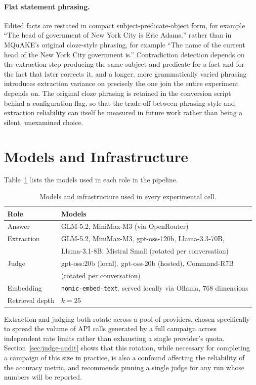 \paragraph{Flat statement phrasing.} Edited facts are restated in compact subject-predicate-object form, for example ``The head of government of New York City is Eric Adams,'' rather than in MQuAKE's original cloze-style phrasing, for example ``The name of the current head of the New York City government is.'' Contradiction detection depends on the extraction step producing the same subject and predicate for a fact and for the fact that later corrects it, and a longer, more grammatically varied phrasing introduces extraction variance on precisely the one join the entire experiment depends on. The original cloze phrasing is retained in the conversion script behind a configuration flag, so that the trade-off between phrasing style and extraction reliability can itself be measured in future work rather than being a silent, unexamined choice.

\section{Models and Infrastructure}
\label{sec:models-infra}

Table~\ref{tab:models} lists the models used in each role in the pipeline.

\begin{table}[H]
\centering
\caption{Models and infrastructure used in every experimental cell.}
\label{tab:models}
\begin{tabular}{ll}
\toprule
Role & Models \\
\midrule
Answer & GLM-5.2, MiniMax-M3 (via OpenRouter) \\
Extraction & GLM-5.2, MiniMax-M3, gpt-oss-120b, Llama-3.3-70B, \\
 & Llama-3.1-8B, Mistral Small (rotated per conversation) \\
Judge & gpt-oss:20b (local), gpt-oss-20b (hosted), Command-R7B \\
 & (rotated per conversation) \\
Embedding & \texttt{nomic-embed-text}, served locally via Ollama, 768 dimensions \\
Retrieval depth & $k = 25$ \\
\bottomrule
\end{tabular}
\end{table}

Extraction and judging both rotate across a pool of providers, chosen specifically to spread the volume of API calls generated by a full campaign across independent rate limits rather than exhausting a single provider's quota. Section~\ref{sec:judge-audit} shows that this rotation, while necessary for completing a campaign of this size in practice, is also a confound affecting the reliability of the accuracy metric, and recommends pinning a single judge for any run whose numbers will be reported.

